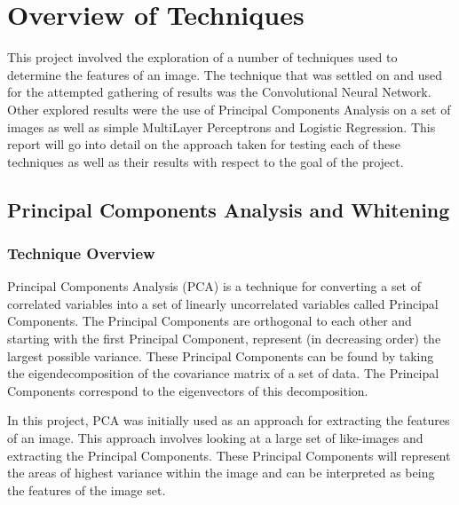 \documentclass[12pt, titlepage]{article}
\begin{document}
\newpage
\section{Overview of Techniques}

This project involved the exploration of a number of techniques used to determine the features of an image. The technique that was settled
on and used for the attempted gathering of results was the Convolutional Neural Network. Other explored results were the use of Principal
Components Analysis on a set of images as well as simple MultiLayer Perceptrons and Logistic Regression. This report will go into detail on
the approach taken for testing each of these techniques as well as their results with respect to the goal of the project.

\subsection{Principal Components Analysis and Whitening}
  \subsubsection{Technique Overview}
  
  Principal Components Analysis (PCA) is a technique for converting a set of correlated variables into a set of linearly uncorrelated variables
  called Principal Components. The Principal Components are orthogonal to each other and starting with the first Principal Component, represent
  (in decreasing order) the largest possible variance. These Principal Components can be found by taking the eigendecomposition of the covariance
  matrix of a set of data. The Principal Components correspond to the eigenvectors of this decomposition.

  In this project, PCA was initially used as an approach for extracting the features of an image. This approach involves looking at a large set of
  like-images and extracting the Principal Components. These Principal Components will represent the areas of highest variance within the image and
  can be interpreted as being the features of the image set.
  
\end{document}
